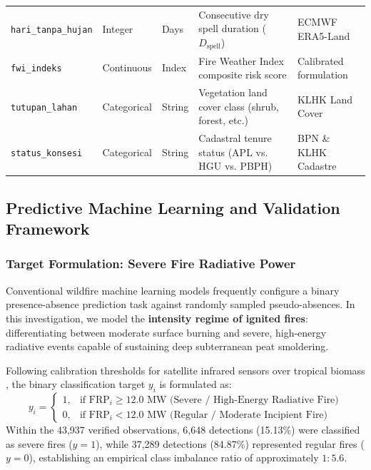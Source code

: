 \begin{table}[htbp]
\begin{tabular}{lllll}
\texttt{hari\_tanpa\_hujan} & Integer & Days & Consecutive dry spell duration ($D_{\text{spell}}$) & ECMWF ERA5-Land \\
\texttt{fwi\_indeks} & Continuous & Index & Fire Weather Index composite risk score & Calibrated formulation \\
\texttt{tutupan\_lahan} & Categorical & String & Vegetation land cover class (shrub, forest, etc.) & KLHK Land Cover \\
\texttt{status\_konsesi} & Categorical & String & Cadastral tenure status (APL vs. HGU vs. PBPH) & BPN \& KLHK Cadastre \\
\bottomrule
\end{tabular}
\end{table}

\subsection{Predictive Machine Learning and Validation Framework}
\label{subsec:ml_framework}

\subsubsection{Target Formulation: Severe Fire Radiative Power}
\label{subsubsec:target_def}

Conventional wildfire machine learning models frequently configure a binary presence-absence prediction task against randomly sampled pseudo-absences. In this investigation, we model the \textbf{intensity regime of ignited fires}: differentiating between moderate surface burning and severe, high-energy radiative events capable of sustaining deep subterranean peat smoldering.

Following calibration thresholds for satellite infrared sensors over tropical biomass \citep{RobertsWooster2008JGR, Wooster2018NatGeosci}, the binary classification target $y_i$ is formulated as:
\begin{equation}
y_i = \begin{cases} 
1, & \text{if } \text{FRP}_i \ge 12.0\text{ MW (Severe / High-Energy Radiative Fire)} \\ 
0, & \text{if } \text{FRP}_i < 12.0\text{ MW (Regular / Moderate Incipient Fire)} 
\end{cases}
\label{eq:target}
\end{equation}
Within the 43,937 verified observations, 6,648 detections (15.13\%) were classified as severe fires ($y=1$), while 37,289 detections (84.87\%) represented regular fires ($y=0$), establishing an empirical class imbalance ratio of approximately $1 : 5.6$.

